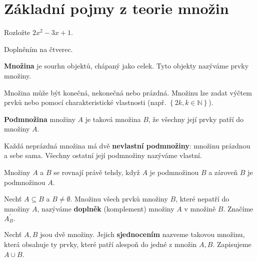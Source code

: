 \section{Základní pojmy z teorie množin}

\begin{priklad}
    Rozložte $2x^2 - 3x+1.$
\end{priklad}

\begin{reseni}
Doplněním na čtverec.
\end{reseni}

\begin{definition}
  \textbf{Množina} je sourhn objektů, chápaný jako celek. Tyto objekty nazýváme prvky množiny.
\end{definition}

\begin{pozn}
Množina může být konečná, nekonečná nebo prázdná. Množinu lze zadat výčtem prvků nebo pomocí charakteristické vlastnosti (např. $\left \{ 2k, k \in \mathbb{N}\right\}$).

\end{pozn}

\begin{definition}
  \textbf{Podmnožina} množiny $A$ je taková množina $B$, že všechny její prvky patří do množiny $A$.
\end{definition}

\begin{pozn}
Každá neprázdná množina má dvě \textbf{nevlastní podmnožiny}: množinu prázdnou a sebe sama. Všechny ostatní její podmnožiny nazýváme vlastní.

\end{pozn}
\begin{definition}
  Množiny $A$ a $B$ se rovnají právě tehdy, když $A$ je podmnožinou $B$ a zároveň $B$ je podmnožinou $A$.
\end{definition}

\begin{definition}
  Nechť $A \subseteq B$ a $B\neq \emptyset$. Množinu všech prvků množiny $B$, které nepatří do množiny $A$, nazýváme \textbf{doplněk} (komplement) množiny $A$ v množině $B$. Značíme $A_B^\prime.$
\end{definition}

\begin{definition}
  Nechť $A, B$ jsou dvě množiny. Jejich \textbf{sjednocením} nazveme takovou množinu, která obsahuje ty prvky, které patří alespoň do jedné z množin $A, B$. Zapisujeme $A \cup B$.
\end{definition}


